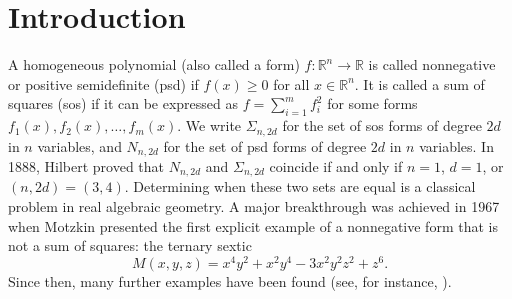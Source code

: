 \documentclass[12pt]{elsarticle}
\theoremstyle{definition}
\begin{document}
\section{Introduction}
A homogeneous polynomial (also called a form) $f:\mathbb{R}^n\to\mathbb{R}$ is called nonnegative or positive semidefinite (psd) if $f(x)\ge 0$ for all $x\in\mathbb{R}^n$. It is called a sum of squares (sos) if it can be expressed as $f = \sum_{i=1}^m f_i^2$ for some forms $f_1(x), f_2(x), \dots, f_m(x)$. We write $\Sigma_{n,2d}$ for the set of sos forms of degree $2d$ in $n$ variables, and $N_{n,2d}$ for the set of psd forms of degree $2d$ in $n$ variables. In 1888, Hilbert \cite{hilbert1888darstellung} proved that $N_{n,2d}$ and $\Sigma_{n,2d}$ coincide if and only if $n=1$, $d=1$, or $(n,2d)=(3,4)$. Determining when these two sets are equal is a classical problem in real algebraic geometry. A major breakthrough was achieved in 1967 when Motzkin presented the first explicit example of a nonnegative form that is not a sum of squares: the ternary sextic \citep{motzkin1967arithmetic}
\[ M(x,y,z) = x^4 y^2 + x^2 y^4 - 3 x^2 y^2 z^2 + z^6. \]
Since then, many further examples have been found (see, for instance, \cite{choi1977extremal, choi1977old, choi1980real, reznick2000some, robinson1973some}).
\end{document}
